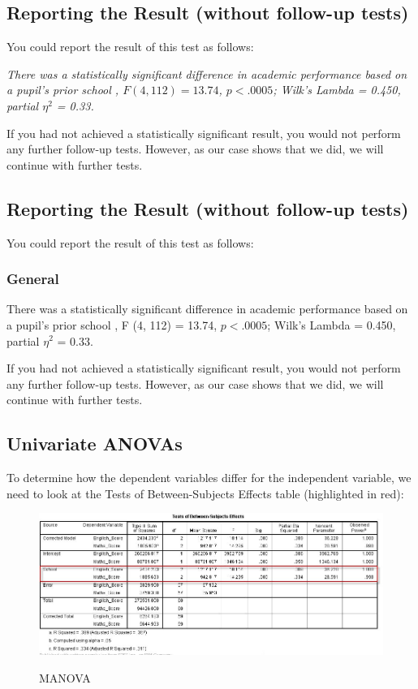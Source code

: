 \documentclass[a4paper,12pt]{article}
\begin{document}
\subsection{Reporting the Result (without follow-up tests)}
You could report the result of this test as follows:

\emph{
	There was a statistically significant difference in academic performance based on a pupil's prior school , $F(4, 112) = 13.74$, $p < .0005$; Wilk's Lambda = 0.450, partial $\eta^2$ = 0.33.
}

If you had not achieved a statistically significant result, you would not perform any further follow-up tests. However, as our case shows that we did, we will continue with further tests.







\subsection{Reporting the Result (without follow-up tests)}
You could report the result of this test as follows:

\subsubsection{General}
There was a statistically significant difference in academic performance based on a pupil's prior school , F (4, 112) = 13.74, $p < .0005$; Wilk's Lambda = 0.450, partial $\eta^2$ = 0.33.

If you had not achieved a statistically significant result, you would not perform any further follow-up tests. However, as our case shows that we did, we will continue with further tests.





\subsection{Univariate ANOVAs}
To determine how the dependent variables differ for the independent variable, we need to look at the Tests of Between-Subjects Effects table (highlighted in red):

\begin{center}
	\begin{figure}[h!]
		\includegraphics[scale=0.5]{MANOVA9}\\
		\caption{MANOVA}
	\end{figure}
\end{center}
\end{document}
